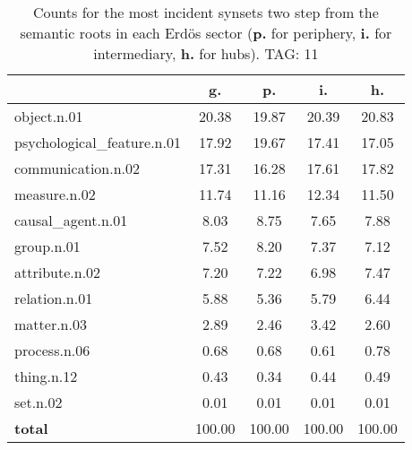 \begin{table}[h!]
\begin{center}
\begin{tabular}{| l | c | c | c | c |}\hline
 & g. & p. & i. & h. \\\hline
object.n.01 & 20.38  & 19.87  & 20.39  & 20.83 \\\hline
psychological\_feature.n.01 & 17.92  & 19.67  & 17.41  & 17.05 \\\hline
communication.n.02 & 17.31  & 16.28  & 17.61  & 17.82 \\\hline
measure.n.02 & 11.74  & 11.16  & 12.34  & 11.50 \\\hline
causal\_agent.n.01 & 8.03  & 8.75  & 7.65  & 7.88 \\\hline
group.n.01 & 7.52  & 8.20  & 7.37  & 7.12 \\\hline
attribute.n.02 & 7.20  & 7.22  & 6.98  & 7.47 \\\hline
relation.n.01 & 5.88  & 5.36  & 5.79  & 6.44 \\\hline
matter.n.03 & 2.89  & 2.46  & 3.42  & 2.60 \\\hline
process.n.06 & 0.68  & 0.68  & 0.61  & 0.78 \\\hline
thing.n.12 & 0.43  & 0.34  & 0.44  & 0.49 \\\hline
set.n.02 & 0.01  & 0.01  & 0.01  & 0.01 \\\hline
{{\bf total}} & 100.00  & 100.00  & 100.00  & 100.00 \\\hline
\end{tabular}
\caption{Counts for the most incident synsets two step from the semantic roots in each Erd\"os sector ({\bf p.} for periphery, {\bf i.} for intermediary, {\bf h.} for hubs). TAG: 11}
\end{center}
\end{table}